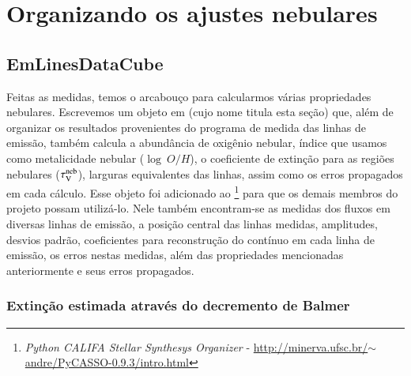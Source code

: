 

\chapter{Organizando os ajustes nebulares}
\label{apendice:organeb}

\section{EmLinesDataCube}
\label{apendice:organeb:EmLinesDataCube}

Feitas as medidas, temos o arcabouço para calcularmos várias propriedades nebulares. Escrevemos um
objeto em \pyt (cujo nome titula esta seção) que, além de organizar os resultados provenientes do
programa de medida das linhas de emissão, também calcula a abundância de oxigênio nebular, índice
que usamos como metalicidade nebular ($\log\ O/H$), o coeficiente de extinção para as regiões
nebulares ($\tau_{\mathrm{V}}^{\mathrm{neb}}$), larguras equivalentes das linhas, assim como os erros propagados em cada
cálculo. Esse objeto foi adicionado ao \pycasso\footnote{{\em Python CALIFA Stellar Synthesys
Organizer} -
\href{http://minerva.ufsc.br/~andre/PyCASSO-0.9.3/intro.html}
{http://minerva.ufsc.br/$\sim$andre/PyCASSO-0.9.3/intro.html}} \citep{CidFernandes.etal.2013a} para
que os demais membros do projeto possam utilizá-lo. Nele também encontram-se as medidas dos fluxos
em diversas linhas de emissão, a posição central das linhas medidas, amplitudes, desvios padrão,
coeficientes para reconstrução do contínuo em cada linha de emissão, os erros nestas medidas, além
das propriedades mencionadas anteriormente e seus erros propagados.

\subsection{Extinção estimada através do decremento de Balmer}
\label{apendice:organeb:datacube:tauvneb}

